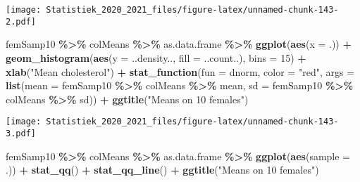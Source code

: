 \documentclass[
  12pt,dutch,coursenotes]{book}
\newenvironment{Shaded}{\begin{snugshade}}{\end{snugshade}}
\newcommand{\DataTypeTok}[1]{\textcolor[rgb]{0.13,0.29,0.53}{#1}}
\newcommand{\DecValTok}[1]{\textcolor[rgb]{0.00,0.00,0.81}{#1}}
\newcommand{\KeywordTok}[1]{\textcolor[rgb]{0.13,0.29,0.53}{\textbf{#1}}}
\newcommand{\NormalTok}[1]{#1}
\newcommand{\OperatorTok}[1]{\textcolor[rgb]{0.81,0.36,0.00}{\textbf{#1}}}
\newcommand{\StringTok}[1]{\textcolor[rgb]{0.31,0.60,0.02}{#1}}
\theoremstyle{definition}
\theoremstyle{definition}
\theoremstyle{definition}
\theoremstyle{remark}
\begin{document}
\texttt{[image: Statistiek\_2020\_2021\_files/figure-latex/unnamed-chunk-143-2.pdf]}

\begin{Shaded}
\begin{Highlighting}[]
\NormalTok{femSamp10 }\OperatorTok{\%\textgreater{}\%}\StringTok{ }\NormalTok{colMeans }\OperatorTok{\%\textgreater{}\%}\StringTok{ }\NormalTok{as.data.frame }\OperatorTok{\%\textgreater{}\%}\StringTok{ }\KeywordTok{ggplot}\NormalTok{(}\KeywordTok{aes}\NormalTok{(}\DataTypeTok{x =}\NormalTok{ .)) }\OperatorTok{+}\StringTok{ }
\StringTok{    }\KeywordTok{geom\_histogram}\NormalTok{(}\KeywordTok{aes}\NormalTok{(}\DataTypeTok{y =}\NormalTok{ ..density.., }\DataTypeTok{fill =}\NormalTok{ ..count..), }
        \DataTypeTok{bins =} \DecValTok{15}\NormalTok{) }\OperatorTok{+}\StringTok{ }\KeywordTok{xlab}\NormalTok{(}\StringTok{"Mean cholesterol"}\NormalTok{) }\OperatorTok{+}\StringTok{ }\KeywordTok{stat\_function}\NormalTok{(}\DataTypeTok{fun =}\NormalTok{ dnorm, }
    \DataTypeTok{color =} \StringTok{"red"}\NormalTok{, }\DataTypeTok{args =} \KeywordTok{list}\NormalTok{(}\DataTypeTok{mean =}\NormalTok{ femSamp10 }\OperatorTok{\%\textgreater{}\%}\StringTok{ }
\StringTok{        }\NormalTok{colMeans }\OperatorTok{\%\textgreater{}\%}\StringTok{ }\NormalTok{mean, }\DataTypeTok{sd =}\NormalTok{ femSamp10 }\OperatorTok{\%\textgreater{}\%}\StringTok{ }\NormalTok{colMeans }\OperatorTok{\%\textgreater{}\%}\StringTok{ }
\StringTok{        }\NormalTok{sd)) }\OperatorTok{+}\StringTok{ }\KeywordTok{ggtitle}\NormalTok{(}\StringTok{"Means on 10 females"}\NormalTok{)}
\end{Highlighting}
\end{Shaded}

\texttt{[image: Statistiek\_2020\_2021\_files/figure-latex/unnamed-chunk-143-3.pdf]}

\begin{Shaded}
\begin{Highlighting}[]
\NormalTok{femSamp10 }\OperatorTok{\%\textgreater{}\%}\StringTok{ }\NormalTok{colMeans }\OperatorTok{\%\textgreater{}\%}\StringTok{ }\NormalTok{as.data.frame }\OperatorTok{\%\textgreater{}\%}\StringTok{ }\KeywordTok{ggplot}\NormalTok{(}\KeywordTok{aes}\NormalTok{(}\DataTypeTok{sample =}\NormalTok{ .)) }\OperatorTok{+}\StringTok{ }
\StringTok{    }\KeywordTok{stat\_qq}\NormalTok{() }\OperatorTok{+}\StringTok{ }\KeywordTok{stat\_qq\_line}\NormalTok{() }\OperatorTok{+}\StringTok{ }\KeywordTok{ggtitle}\NormalTok{(}\StringTok{"Means on 10 females"}\NormalTok{)}
\end{Highlighting}
\end{Shaded}
\end{document}
